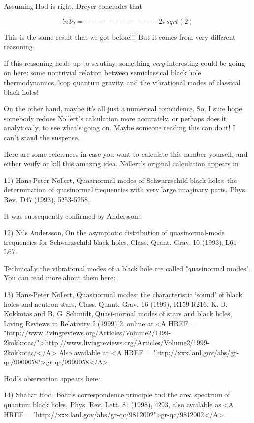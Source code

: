 Assuming Hod is right, Dreyer concludes that
   

$$

            ln 3
\gamma  = -----------
        2 \pi  sqrt(2)
$$
    
This is the same result that we got before!!!  But it comes from very
different reasoning.  

If this reasoning holds up to scrutiny, something \emph{very} interesting
could be going on here: some nontrivial relation between semiclassical
black hole thermodynamics, loop quantum gravity, and the vibrational
modes of classical black holes!

On the other hand, maybe it's all just a numerical coincidence.  So, 
I sure hope somebody redoes Nollert's calculation more accurately, or
perhaps does it analytically, to see what's going on.  Maybe someone
reading this can do it!  I can't stand the suspense.

Here are some references in case you want to calculate this number
yourself, and either verify or kill this amazing idea.  Nollert's
original calculation appears in

11) Hans-Peter Nollert, Quasinormal modes of Schwarzschild black
holes: the determination of quasinormal frequencies with very large
imaginary parts, Phys. Rev. D47 (1993), 5253-5258.

It was subsequently confirmed by Andersson:

12) Nils Andersson, On the asymptotic distribution of quasinormal-mode
frequencies for Schwarzschild black holes, Class. Quant. Grav. 10
(1993), L61-L67.  

Technically the vibrational modes of a black hole are called
"quasinormal modes".  You can read more about them here:

13) Hans-Peter Nollert, Quasinormal modes: the characteristic
`sound' of black holes and neutron stars, Class. Quant. Grav. 16
(1999), R159-R216.
K. D. Kokkotas and B. G. Schmidt, Quasi-normal modes of stars
and black holes, Living Reviews in Relativity 2 (1999) 2, 
online at <A HREF = "http://www.livingreviews.org/Articles/Volume2/1999-2kokkotas/">http://www.livingreviews.org/Articles/Volume2/1999-2kokkotas/</A>
Also available at <A HREF = "http://xxx.lanl.gov/abs/gr-qc/9909058">gr-qc/9909058</A>.

Hod's observation appears here:

14) Shahar Hod, Bohr's correspondence principle and the area spectrum 
of quantum black holes, Phys. Rev. Lett. 81 (1998), 4293, also available 
as <A HREF = "http://xxx.lanl.gov/abs/gr-qc/9812002">gr-qc/9812002</A>.

